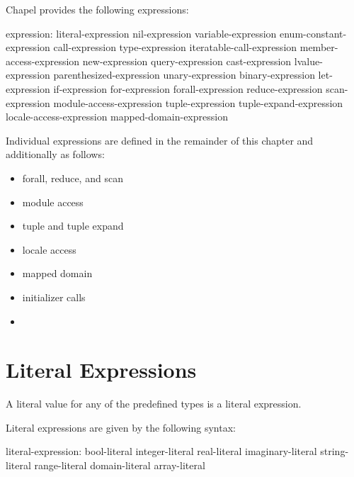 \label{Expressions}

Chapel provides the following expressions:

\begin{syntax}
expression:
  literal-expression
  nil-expression
  variable-expression
  enum-constant-expression
  call-expression
  type-expression
  iteratable-call-expression
  member-access-expression
  new-expression
  query-expression
  cast-expression
  lvalue-expression
  parenthesized-expression
  unary-expression
  binary-expression
  let-expression
  if-expression
  for-expression
  forall-expression
  reduce-expression
  scan-expression
  module-access-expression
  tuple-expression
  tuple-expand-expression
  locale-access-expression
  mapped-domain-expression
\end{syntax}

Individual expressions are defined in the remainder of this chapter
and additionally as follows:

\begin{itemize}
\item forall, reduce, and scan 
\item module access 
\item tuple and tuple expand 
\item locale access 
\item mapped domain 
\item initializer calls 
\item {} 
\end{itemize}

\section{Literal Expressions}
\label{Literal_Expressions}

A literal value for any of the predefined types is a literal expression.

Literal expressions are given by the following syntax:
\begin{syntax}
literal-expression:
  bool-literal
  integer-literal
  real-literal
  imaginary-literal
  string-literal
  range-literal
  domain-literal
  array-literal
\end{syntax}

